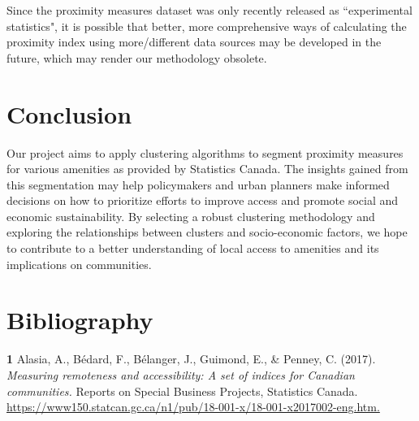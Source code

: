 \documentclass[11pt, a4paper]{article}
\newcommand{\comment}[1]{}
\begin{document}
Since the proximity measures dataset was only recently released as ``experimental statistics", it is possible that better, more comprehensive ways of calculating the proximity index using more/different data sources may be developed in the future, which may render our methodology obsolete. 

\comment{
\begin{enumerate}
\item Since the proximity measures dataset was only recently released as ``experimental statistics", it is possible that better, more comprehensive ways of calculating the proximity index using more/different data sources may be developed in the future, which may render our methodology obsolete.
\end{enumerate}
}





\section*{Conclusion}


Our project aims to apply clustering algorithms to segment proximity measures for various amenities as provided by Statistics Canada. The insights gained from this segmentation may help policymakers and urban planners make informed decisions on how to prioritize efforts to improve access and promote social and economic sustainability. By selecting a robust clustering methodology and exploring the relationships between clusters and socio-economic factors, we hope to contribute to a better understanding of local access to amenities and its implications on communities.




\pagebreak
\section*{Bibliography}

\noindent\textbf{1} Alasia, A., Bédard, F., Bélanger, J., Guimond, E., \& Penney, C. (2017). \textit{Measuring remoteness and accessibility: A set of indices for Canadian communities.} Reports on Special Business Projects, Statistics Canada. \sloppy\url{https://www150.statcan.gc.ca/n1/pub/18-001-x/18-001-x2017002-eng.htm.} \\
\end{document}
